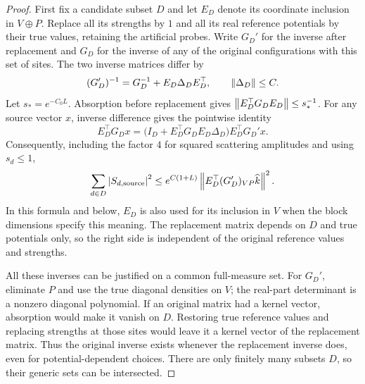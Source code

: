 \begin{proof}
First fix a candidate subset $D$ and let $E_D$ denote its coordinate
inclusion in $V\oplus P$. Replace all its strengths by $1$ and all
its real reference potentials by their true values, retaining the
artificial probes. Write $G_D'$ for the inverse after replacement
and $G_D$ for the inverse of any of the original configurations with
this set of sites. The two inverse matrices differ by
\[
 (G_D')^{-1}=G_D^{-1}+E_D\Delta_D E_D^\top,
 \qquad \left\lVert\Delta_D\right\rVert\le C.
\]
Let $s_* = e^{-C_0L}$. Absorption before replacement gives
$\left\lVert E_D^\top G_D E_D\right\rVert\le s_*^{-1}$. For any source vector $x$,
inverse difference gives the pointwise identity
\[
 E_D^\top G_Dx
 =\bigl(I_D+E_D^\top G_D E_D\Delta_D\bigr)
      E_D^\top G_D'x.
\]
Consequently, including the factor $4$ for squared scattering
amplitudes and using $s_d\le1$,
\begin{equation}
 \sum_{d\in D}\left\lvert S_{d,\rm source}\right\rvert^2
 \le e^{C(1+L)}
       \left\lVert E_D^\top(G_D')_{VP}\widehat k\right\rVert^2.
 \label{trans:replacement}
\end{equation}
In this formula and below, $E_D$ is also used for its inclusion in
$V$ when the block dimensions specify this meaning. The replacement
matrix depends on $D$ and true potentials only, so the right side
is independent of the original reference values and strengths.

All these inverses can be justified on a common full-measure set.
For $G_D'$, eliminate $P$ and use the true diagonal densities on $V$;
the real-part determinant is a nonzero diagonal polynomial. If an
original matrix had a kernel vector, absorption would make it vanish
on $D$. Restoring true reference values and replacing strengths at
those sites would leave it a kernel vector of the replacement
matrix. Thus the original inverse exists whenever the replacement
inverse does, even for potential-dependent choices. There are only
finitely many subsets $D$, so their generic sets can be intersected.


\end{proof}
